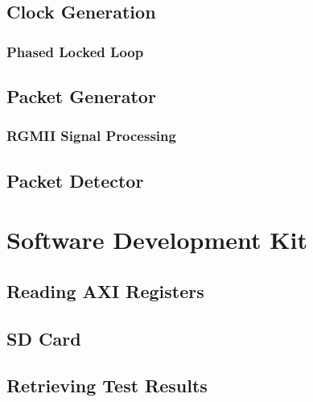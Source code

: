 \subsection{Clock Generation}
\subsubsection{Phased Locked Loop}
\subsection{Packet Generator}
\subsubsection{RGMII Signal Processing}
\subsection{Packet Detector}
\section{Software Development Kit}
\subsection{Reading AXI Registers}
\subsection{SD Card}
\subsection{Retrieving Test Results}

